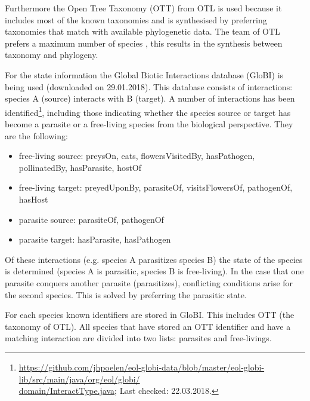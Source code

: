     Furthermore the Open Tree Taxonomy (OTT) from OTL is used because it includes most of the known 
      taxonomies and is synthesised by preferring taxonomies that match with available phylogenetic 
      data. The team of OTL prefers a maximum number of species \cite{Hinchliff2015}, this results in 
      the synthesis between taxonomy and phylogeny.

    For the state information the Global Biotic Interactions database (GloBI) is being used
      \cite{Poelen2014} (downloaded on 29.01.2018). This database consists of interactions: species A 
      (source) interacts with B (target). A number of interactions has been 
      identified\footnote{\hyperlink{
        https://github.com/jhpoelen/eol-globi-data/blob/master/eol-globi-lib/src/main/java/org/eol/globi/domain/InteractType.java
        }{https://github.com/jhpoelen/eol-globi-data/blob/master/eol-globi-lib/src/main/java/org/eol/globi/ \\ domain/InteractType.java}; Last checked: 22.03.2018.
      }, including those indicating whether the species source or target has become a parasite or a 
      free-living species from the biological perspective. They are the following:
    \begin{itemize}
      \item free-living source: preysOn, eats, flowersVisitedBy, hasPathogen, pollinatedBy, 
        hasParasite, hostOf
      \item free-living target: preyedUponBy, parasiteOf, visitsFlowersOf, pathogenOf, hasHost
      \item parasite source: parasiteOf, pathogenOf
      \item parasite target: hasParasite, hasPathogen
    \end{itemize}

    Of these interactions (e.g. species A parasitizes species B) the state of the species is 
      determined (species A is parasitic, species B is free-living). In the case that one parasite 
      conquers another parasite (parasitizes), conflicting conditions arise for the second species.
      This is solved by preferring the parasitic state.

    For each species known identifiers are stored in GloBI. This includes OTT (the taxonomy of OTL). 
      All species that have stored an OTT identifier and have a matching interaction are divided into 
      two lists: parasites and free-livings.

